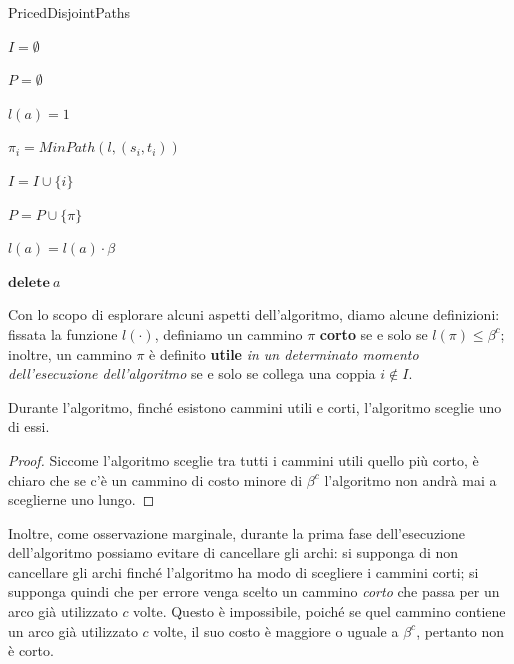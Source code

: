 \begin{algorithm}
	\caption{PricedDisjointPaths}
	\label{algo:PricedDisjointPaths}

	$I = \emptyset$ 

	$P = \emptyset$ 

	{
		$l(a) = 1$
	}
	{


		$ \pi_i = MinPath(l, (s_i, t_i) )$
		{


		}

		$I = I \cup \{i\}$

		$P = P \cup \{\pi\}$


		{

			$l(a) = l(a) \cdot \beta $


			{
				$\mathbf{delete} ~ a$
			}
		}
	}

\end{algorithm}

\noindent
Con lo scopo di esplorare alcuni aspetti dell'algoritmo, diamo alcune
definizioni: fissata la funzione $l(\cdot)$, definiamo un cammino $\pi$
\textbf{corto} se e solo se $l(\pi) \leq \beta^c$; inoltre, un cammino $\pi$ è
definito \textbf{utile} \textit{in un determinato momento dell'esecuzione dell'algoritmo}
se e solo se collega una coppia $i \notin I$.

\begin{lemma}\label{lem:priceddpaths_su}
	Durante l'algoritmo, finché esistono cammini utili e corti,
	l'algoritmo sceglie uno di essi.
\end{lemma}
\begin{proof}
	Siccome l'algoritmo sceglie tra tutti i cammini utili quello più corto,
	è chiaro che se c'è un cammino di costo minore di $\beta^c$ l'algoritmo
	non andrà mai a sceglierne uno lungo.
\end{proof}

Inoltre, come osservazione marginale, durante la prima fase dell'esecuzione
dell'algoritmo possiamo evitare di cancellare gli archi: si supponga di non
cancellare gli archi finché l'algoritmo ha modo di scegliere i cammini corti;
si supponga quindi che per errore venga scelto un cammino \textit{corto}
che passa per un arco già utilizzato $c$ volte. Questo è impossibile, poiché
se quel cammino contiene un arco già utilizzato $c$ volte, il suo costo è
maggiore o uguale a $\beta^c$, pertanto non è corto.

